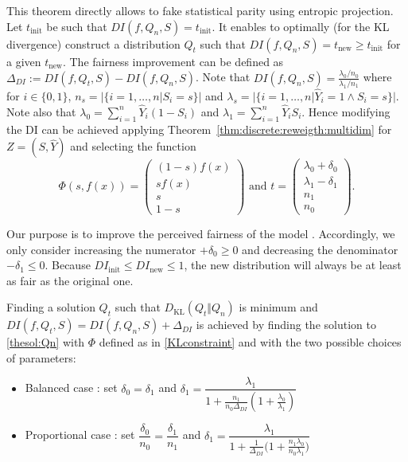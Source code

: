 \documentclass[runningheads, orivec]{llncs}
\newcommand{\KL}{D_{\mathrm{KL}}}
\begin{document}
This theorem directly allows to fake statistical parity using entropic projection.
Let $t_{\text{init}}$ be such that $DI(f,Q_n,S) = t_{\text{init}}$. It enables to optimally (for the KL divergence) construct a distribution $Q_t$ such that $DI(f,Q_n,S) = t_{\text{new}} \geq t_{\text{init}}$ for a given $t_{\text{new}}$. The fairness improvement can be defined as $\Delta_{DI}:= DI(f,Q_t,S) - DI(f,Q_n,S)$.
Note that $ DI(f,Q_n,S)= \frac{\lambda_0 / n_0}{\lambda_1 / n_1}$ where for $i \in \{0,1\}$, $n_s = |\{i=1,\dots,n | S_i=s\}|$ and $\lambda_s = |\{i=1,\dots,n | \widehat{Y}_i=1 \land S_i=s\}|$. 
Note also that $\lambda_0 = \sum_{i=1}^n \widehat{Y}_i(1-S_i)$ and $\lambda_1 = \sum_{i=1}^n \widehat{Y}_iS_i$. Hence modifying the DI can be achieved applying Theorem~\ref{thm:discrete:reweigth:multidim} for $Z=(S,\widehat{Y})$ and selecting the function 
\begin{equation}
  \label{KLconstraint}
 \Phi(s, f(x)) = \begin{pmatrix} (1-s)f(x) \\ sf(x) \\ s \\ 1-s \end{pmatrix} \text{ and } t = \begin{pmatrix} \lambda_0 + \delta_0 \\ \lambda_1 - \delta_1 \\ n_1 \\ n_0 \end{pmatrix}. \end{equation}

Our purpose is to improve the perceived fairness of the model%
. Accordingly, we only consider increasing the numerator $ + \delta_0 \geq 0$ and decreasing the denominator $- \delta_1 \leq 0$. Because $DI_\text{init} \leq DI_{\text{new}} \leq 1$, the new distribution will always be at least as fair as the original one.
\begin{proposition} \label{th:FWKL} Finding a solution $Q_t$ such that $\KL(Q_t \Vert Q_n)$ is minimum and $DI(f,Q_t,S)=DI(f,Q_n,S)+\Delta_{DI}$ is achieved by finding the solution to \eqref{thesol:Qn} with $\Phi$ defined as in \eqref{KLconstraint} and with the two possible choices of parameters:
\begin{itemize}
  \item Balanced case : set $\delta_0 = \delta_1$ and  $\delta_1 = \dfrac{\lambda_1}{1 + \frac{n_1}{n_0\Delta_{DI}}(1 + \frac{\lambda_0}{\lambda_1})}$
   
\item Proportional case : set $\dfrac{\delta_0}{n_0} = \dfrac{\delta_1}{n_1}$ and
    $ \delta_1 = \dfrac{\lambda_1}{1 + \frac{1}{\Delta_{DI}}\big(1 + \frac{n_1\lambda_0}{n_0\lambda_1}\big)} $
  \end{itemize}
  \end{proposition}
\end{document}

